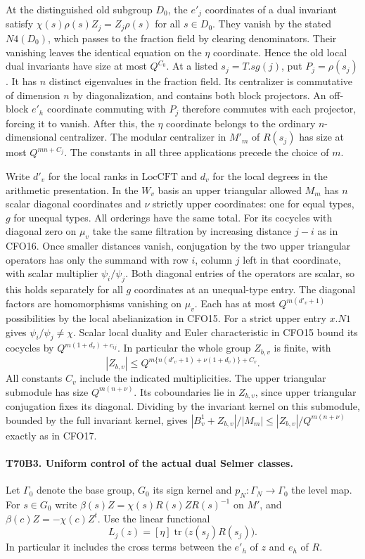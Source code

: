 At the distinguished old subgroup $D_0$, the $e'_j$ coordinates
of a dual invariant satisfy $\chi(s)\rho(s)Z_j=Z_j\rho(s)$
for all $s\in D_0$. They vanish by the stated $N4(D_0)$,
which passes to the fraction field by clearing denominators.
Their vanishing leaves the identical equation on the $\eta$
coordinate. Hence the old local dual invariants have size
at most $Q^{C_0}$. At a listed $s_j=T.sg(j)$, put $P_j=\rho(s_j)$.
It has $n$ distinct eigenvalues in the fraction field. Its
centralizer is commutative of dimension $n$ by diagonalization,
and contains both block projectors. An off-block $e'_h$ coordinate
commuting with $P_j$ therefore commutes with each projector,
forcing it to vanish. After this, the $\eta$ coordinate belongs
to the ordinary $n$-dimensional centralizer. The modular
centralizer in $M'_m$ of $R(s_j)$ has size at most
$Q^{mn+C_j}$. The constants in all three applications precede
the choice of $m$.

Write $d'_v$ for the local ranks in $\mathrm{LocCFT}$ and $d_v$
for the local degrees in the arithmetic presentation. In the
$W_v$ basis an upper triangular allowed $M_m$ has $n$ scalar
diagonal coordinates and $\nu$ strictly upper coordinates:
one for equal types, $g$ for unequal types. All orderings have
the same total. For its cocycles with diagonal zero on $\mu_v$
take the same filtration by increasing distance $j-i$ as in
CFO16. Once smaller distances vanish, conjugation by the two
upper triangular operators has only the summand with row $i$,
column $j$ left in that coordinate, with scalar multiplier
$\psi_i/\psi_j$. Both diagonal entries of the operators are
scalar, so this holds separately for all $g$ coordinates at an
unequal-type entry. The diagonal factors are homomorphisms
vanishing on $\mu_v$. Each has at most $Q^{m(d'_v+1)}$
possibilities by the local abelianization in CFO15. For a strict
upper entry $x.N1$ gives $\psi_i/\psi_j\ne\chi$. Scalar local
duality and Euler characteristic in CFO15 bound its cocycles by
$Q^{m(1+d_v)+c_{ij}}$. In particular the whole group $Z_{b,v}$
is finite, with
\[
 |Z_{b,v}|\le
 Q^{m\{n(d'_v+1)+\nu(1+d_v)\}+C_v}.
\]
All constants $C_v$ include the indicated multiplicities.
The upper triangular submodule has size $Q^{m(n+\nu)}$.
Its coboundaries lie in $Z_{b,v}$, since upper triangular
conjugation fixes its diagonal. Dividing by the invariant
kernel on this submodule, bounded by the full invariant
kernel, gives
$|B_v^1+Z_{b,v}|/|M_m|\le |Z_{b,v}|/Q^{m(n+\nu)}$ exactly
as in CFO17.

\paragraph{T70B3. Uniform control of the actual dual Selmer classes.}
Let $\Gamma_0$ denote the base group, $G_0$ its sign kernel
and $p_N:\Gamma_N\to\Gamma_0$ the level map. For $s\in G_0$
write $\beta(s)Z=\chi(s)R(s)ZR(s)^{-1}$ on $M'$, and
$\beta(c)Z=-\chi(c)Z^t$. Use the linear functional
\[
        L_j(z)=[\eta]\operatorname{tr}\bigl(z(s_j)R(s_j)\bigr).
\]
In particular it includes the cross terms between the $e'_h$
of $z$ and $e_h$ of $R$.

